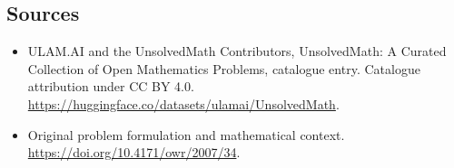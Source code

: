 \documentclass[11pt]{article}
\begin{document}
\subsection{Sources}
\begin{itemize}
\item[\hypertarget{source:statement:1}{S1}] ULAM.AI and the UnsolvedMath Contributors, UnsolvedMath: A Curated Collection of Open Mathematics Problems, catalogue entry. Catalogue attribution under CC BY 4.0.
\url{https://huggingface.co/datasets/ulamai/UnsolvedMath}.
\item[\hypertarget{source:statement:2}{S2}] Original problem formulation and mathematical context.
\url{https://doi.org/10.4171/owr/2007/34}.
\end{itemize}
\label{end:statement}
\end{document}
